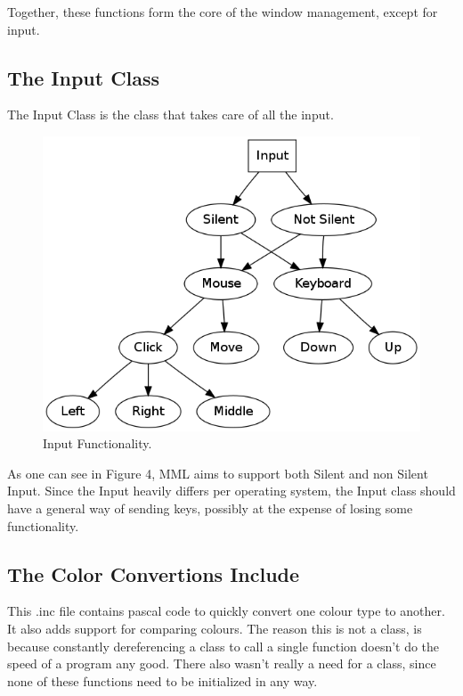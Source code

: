 \documentclass[a4paper, 10pt]{article}
\begin{document}
Together, these functions form the core of the window management, except for input.

\subsection{The Input Class}

The Input Class is the class that takes care of all the input.

\begin{figure}[h]
	\includegraphics[scale=0.4]{Pics/Input_Diag}
	\caption{Input Functionality.}
\end{figure}

As one can see in Figure 4, MML aims to support both Silent and non Silent Input.
Since the Input heavily differs per operating system, the Input class should have a general way of sending keys, possibly at the expense of losing some functionality.

\subsection{The Color Convertions Include}

This .inc file contains pascal code to quickly convert one colour type to another.
It also adds support for comparing colours. The reason this is not a class, is because constantly dereferencing a class to call a single function doesn't do the speed of a program any good. There also wasn't really a need for a class, since none of these functions need to be initialized in any way.
\end{document}
